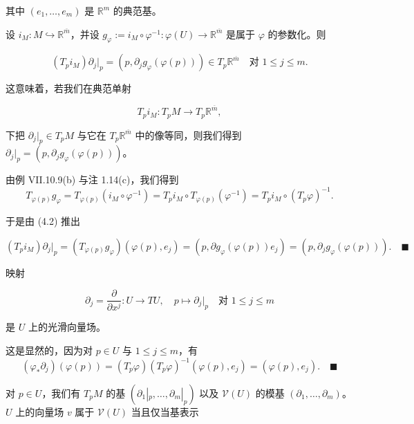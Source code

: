 其中 $ (e_{1},\ldots,e_{m}) $ 是 $ \mathbb{R}^{m} $ 的典范基。


\begin{remark}

\begin{items}
\item

设 $ i_{M} : M \hookrightarrow \mathbb{R}^{\overline{m}} $，并设 $ g_{\varphi} := i_{M} \circ \varphi^{-1} : \varphi(U) \to \mathbb{R}^{\overline{m}} $ 是属于 $ \varphi $ 的参数化。则

\[
(T_{p}i_{M})\partial_{j}|_{p} = (p, \partial_{j}g_{\varphi}(\varphi(p))) \in T_{p}\mathbb{R}^{\overline{m}} \quad \text{对 } 1 \le j \le m .
\]

这意味着，若我们在典范单射

\[
T_{p}i_{M} : T_{p}M \to T_{p}\mathbb{R}^{\overline{m}} ,
\]

下把 $ \partial_{j}|_{p} \in T_{p}M $ 与它在 $ T_{p}\mathbb{R}^{\overline{m}} $ 中的像等同，则我们得到 $ \partial_{j}|_{p} = (p, \partial_{j}g_{\varphi}(\varphi(p))) $。

\proofhead
由例 VII.10.9(b) 与注 1.14(c)，我们得到
\[
T_{\varphi(p)}g_{\varphi} = T_{\varphi(p)}(i_{M} \circ \varphi^{-1}) = T_{p}i_{M} \circ T_{\varphi(p)}(\varphi^{-1}) = T_{p}i_{M} \circ (T_{p}\varphi)^{-1} .
\]

于是由 (4.2) 推出

\[
(T_{p}i_{M})\partial_{j}|_{p} = (T_{\varphi(p)}g_{\varphi})(\varphi(p), e_{j}) = (p, \partial g_{\varphi}(\varphi(p))e_{j}) = (p, \partial_{j}g_{\varphi}(\varphi(p))) .\quad\blacksquare
\]
\item

映射

\[
\partial_{j} = \frac{\partial}{\partial x^{j}} : U \to TU , \quad p \mapsto \partial_{j}|_{p} \quad \text{对 } 1 \le j \le m
\]

是 $ U $ 上的光滑向量场。

\proofhead
这是显然的，因为对 $ p \in U $ 与 $ 1 \le j \le m $，有
\[
(\varphi_{*}\partial_{j})(\varphi(p)) = (T_{p}\varphi)(T_{p}\varphi)^{-1}(\varphi(p), e_{j}) = (\varphi(p), e_{j}) .\quad\blacksquare
\]
\item

对 $ p \in U $，我们有 $ T_{p}M $ 的基 $ (\partial_{1}|_{p},\ldots,\partial_{m}|_{p}) $ 以及 $ \mathcal{V}(U) $ 的模基 $ (\partial_{1},\ldots,\partial_{m}) $。$ U $ 上的向量场 $ v $ 属于 $ \mathcal{V}(U) $ 当且仅当基表示


\end{items}
\end{remark}
